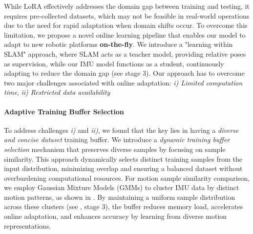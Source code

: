 


While LoRA effectively addresses the domain gap between training and testing, it requires pre-collected datasets, which may not be feasible in real-world operations due to the need for rapid adaptation when domain shifts occur. To overcome this limitation, we propose a novel online learning pipeline that enables our model to adapt to new robotic platforms \textbf{on-the-fly}. We introduce a "learning within SLAM" approach, where SLAM acts as a teacher model, providing relative poses as supervision, while our IMU model functions as a student, continuously adapting to reduce the domain gap (see  stage 3). 
Our approach has to overcome two major challenges associated with online adaptation: \textit{i) Limited computation time}, \textit{ii) Restricted data availability}
 
\paragraph{Adaptive Training Buffer Selection}
To address challenges \textit{i)} and \textit{ii)}, we found that the key lies in having a \textit{diverse and concise dataset} training buffer. We introduce a \textit{dynamic training buffer selection} mechanism that preserves diverse samples by focusing on sample similarity. This approach dynamically selects distinct training samples from the input distribution, minimizing overlap and ensuring a balanced dataset without overburdening computational resources.
For motion sample similarity comparison, we employ Gaussian Mixture Models (GMMs) \cite{Reynolds2018GaussianMM} to cluster IMU data by distinct motion patterns, as shown in . By maintaining a uniform sample distribution across these clusters (see , stage 3), the buffer reduces memory load, accelerates online adaptation, and enhances accuracy by learning from diverse motion representations.
 



